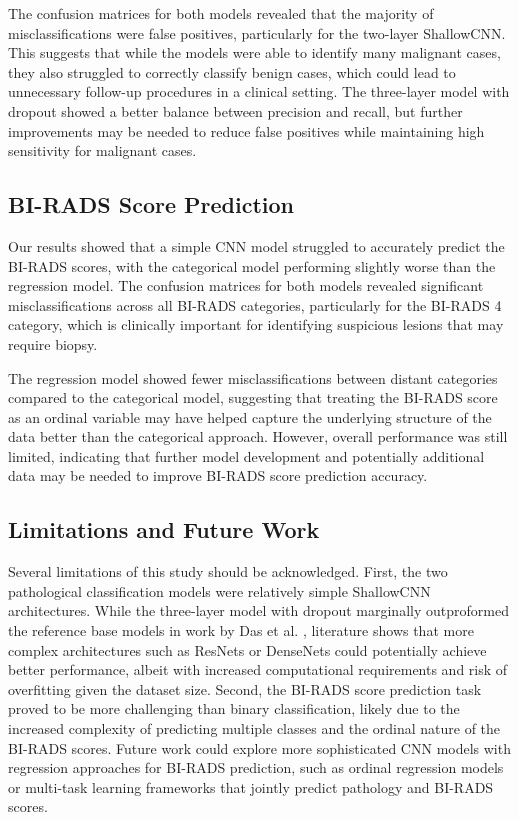 \documentclass[12pt]{article}
\begin{document}
\medskip \noindent
The confusion matrices for both models revealed that the majority of misclassifications were false positives, particularly for the two-layer ShallowCNN. This suggests that while the models were able to identify many malignant cases, they also struggled to correctly classify benign cases, which could lead to unnecessary follow-up procedures in a clinical setting. The three-layer model with dropout showed a better balance between precision and recall, but further improvements may be needed to reduce false positives while maintaining high sensitivity for malignant cases.


\subsection{BI-RADS Score Prediction}
Our results showed that a simple CNN model struggled to accurately predict the BI-RADS scores, with the categorical model performing slightly worse than the regression model. The confusion matrices for both models revealed significant misclassifications across all BI-RADS categories, particularly for the BI-RADS 4 category, which is clinically important for identifying suspicious lesions that may require biopsy.

\medskip \noindent
The regression model showed fewer misclassifications between distant categories compared to the categorical model, suggesting that treating the BI-RADS score as an ordinal variable may have helped capture the underlying structure of the data better than the categorical approach. However, overall performance was still limited, indicating that further model development and potentially additional data may be needed to improve BI-RADS score prediction accuracy.

\subsection{Limitations and Future Work}
Several limitations of this study should be acknowledged. First, the two pathological classification models were relatively simple ShallowCNN architectures. While the three-layer model with dropout marginally outproformed the reference base models in work by Das et al. \cite{ref:example2}, literature shows that  more complex architectures such as ResNets \cite{ref:example2} or DenseNets \cite{ref:densenet} could potentially achieve better performance, albeit with increased computational requirements and risk of overfitting given the dataset size. Second, the BI-RADS score prediction task proved to be more challenging than binary classification, likely due to the increased complexity of predicting multiple classes and the ordinal nature of the BI-RADS scores. Future work could explore more sophisticated CNN models with regression approaches for BI-RADS prediction, such as ordinal regression models or multi-task learning frameworks that jointly predict pathology and BI-RADS scores. 
\end{document}
